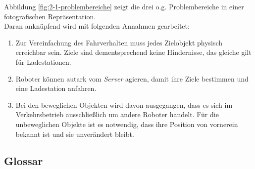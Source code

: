 		Abbildung \ref{fig:2-1-problembereiche} zeigt die drei o.g. Problembereiche in einer fotografischen Repräsentation.\\


		Daran anknüpfend wird mit folgenden Annahmen gearbeitet:

		\begin{enumerate}
		\item
			Zur Vereinfachung des Fahrverhalten muss jedes Zielobjekt physisch
			erreichbar sein. Ziele sind dementsprechend keine Hindernisse, das
			gleiche gilt für Ladestationen.
		\item
			Roboter können autark vom \emph{Server} agieren, damit ihre Ziele
			bestimmen und eine Ladestation anfahren.
		\item
			Bei den beweglichen Objekten wird davon ausgegangen, dass es sich im
			Verkehrsbetrieb ausschließlich um andere Roboter handelt. Für die
			unbeweglichen Objekte ist es notwendig, dass ihre Position von
			vornerein bekannt ist und sie unverändert bleibt.
		\end{enumerate}

		\subsection{Glossar}


		
		
		
